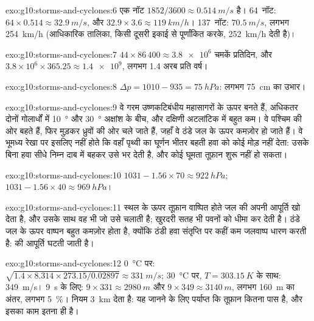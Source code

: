 \begin{solution}{exo:g10:storms-and-cyclones:6}
एक नॉट $1852/3600 \approx \qty{0.514}{m/s}$ है। \num{64}~नॉट: $64 \times
0.514 \approx \qty{32.9}{m/s}$, और $32.9 \times 3.6 \approx
\qty{119}{km/h}$। \num{137}~नॉट: $\qty{70.5}{m/s}$, लगभग
\qty{254}{km/h} (आधिकारिक तालिका, किसी दूसरी इकाई से पूर्णांकित करके,
\qty{252}{km/h} देती है)।
\end{solution}

\begin{solution}{exo:g10:storms-and-cyclones:7}
$44 \times 86\,400 \approx \num{3.8e6}$ चमकें प्रतिदिन, और $3.8\times10^6
\times 365.25 \approx \num{1.4e9}$, लगभग 1.4 अरब प्रति वर्ष।
\end{solution}

\begin{solution}{exo:g10:storms-and-cyclones:8}
$\Delta p = 1010 - 935 = \qty{75}{hPa}$: लगभग \qty{75}{cm} का उभार।
\end{solution}

\begin{solution}{exo:g10:storms-and-cyclones:9}
वे गरम उष्णकटिबंधीय महासागरों के ऊपर बनते हैं, अधिकतर दोनों गोलार्धों में \qty{10}{\degree} और
\qty{30}{\degree} अक्षांश के बीच, और दक्षिणी अटलांटिक में बहुत कम।
वे पश्चिम की ओर बहते हैं, फिर मुड़कर ध्रुवों की ओर चले जाते हैं, जहाँ वे ठंडे जल के ऊपर
कमज़ोर हो जाते हैं। वे भूमध्य रेखा पर इसलिए नहीं होते कि वहाँ
पृथ्वी का घूर्णन भीतर बहती हवा को कोई मोड़ नहीं देता: उसके बिना हवा सीधे
निम्न दाब में बहकर उसे भर देती है, और कोई घूमता तूफ़ान शुरू नहीं हो सकता।
\end{solution}

\begin{solution}{exo:g10:storms-and-cyclones:10}
$1031 - 1.56 \times 70 \approx \qty{922}{hPa}$; $1031 - 1.56 \times 40
\approx \qty{969}{hPa}$।
\end{solution}

\begin{solution}{exo:g10:storms-and-cyclones:11}
स्थल के ऊपर तूफ़ान वाष्पित होते जल की अपनी आपूर्ति खो देता है, और उसके साथ वह
 भी जो उसे चलाती है; खुरदरी सतह भी पवनों को धीमा कर देती है। ठंडे
जल के ऊपर वाष्पन बहुत कमज़ोर होता है, क्योंकि ठंडी हवा संतृप्ति पर कहीं कम
जलवाष्प धारण करती है:  की आपूर्ति घटती जाती है।
\end{solution}

\begin{solution}{exo:g10:storms-and-cyclones:12}
\qty{0}{\degreeCelsius} पर: $\sqrt{1.4 \times 8.314 \times 273.15/0.02897}
\approx \qty{331}{m/s}$; \qty{30}{\degreeCelsius} पर, $T =
\qty{303.15}{K}$ के साथ: \qty{349}{m/s}। \qty{9}{s} के लिए: $9 \times 331 \approx
\qty{2980}{m}$ और $9 \times 349 \approx \qty{3140}{m}$, लगभग
\qty{160}{m} का अंतर, लगभग \qty{5}{\percent}। नियम \qty{3}{km} देता है:
यह जानने के लिए पर्याप्त कि तूफ़ान कितना पास है, और इसका काम इतना ही है।
\end{solution}

